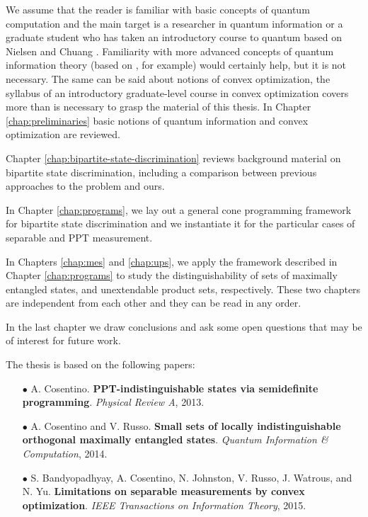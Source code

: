 We assume that the reader is familiar with basic concepts of quantum computation and 
the main target is a researcher in quantum information or a graduate student 
who has taken an introductory course to quantum based on Nielsen and Chuang \cite{Nielsen11}.
Familiarity with more advanced concepts of quantum information theory (based 
on \cite{Watrous15}, for example) would certainly help, but it is not necessary.
The same can be said about notions of convex optimization, the syllabus of an introductory 
graduate-level course in convex optimization covers more than is necessary to grasp
the material of this thesis.
In Chapter \ref{chap:preliminaries} basic notions of quantum information and convex optimization 
are reviewed. 

Chapter \ref{chap:bipartite-state-discrimination} reviews background material 
on bipartite state discrimination, including a comparison between previous approaches 
to the problem and ours.

In Chapter \ref{chap:programs}, we lay out a general cone programming framework
for bipartite state discrimination and we instantiate it for the particular cases
of separable and PPT measurement. 

In Chapters \ref{chap:mes} and \ref{chap:ups}, we apply the framework described in Chapter 
\ref{chap:programs} to study the distinguishability of sets of maximally entangled states, 
and unextendable product sets, respectively.
These two chapters are independent from each other and they can be read in any order.

In the last chapter we draw conclusions and ask some open questions that may be
of interest for future work. 

The thesis is based on the following papers:
\begin{itemize}

\item[$\bullet$]
 A. Cosentino. 
\textbf{PPT-indistinguishable states via semidefinite programming}. 
\textit{Physical Review A}, 2013.
\cite{Cosentino13}

\item[$\bullet$]
A. Cosentino and V. Russo.
\textbf{Small sets of locally indistinguishable orthogonal maximally entangled states}. 
\textit{Quantum Information \& Computation},  2014.
\cite{Cosentino14}

\item[$\bullet$] 
S. Bandyopadhyay, A. Cosentino, N. Johnston, V. Russo, J. Watrous, and N. Yu. 
\textbf{Limitations on separable measurements by convex optimization}. 
\textit{IEEE Transactions on Information Theory}, 2015.
\cite{Bandyopadhyay15}

\end{itemize}